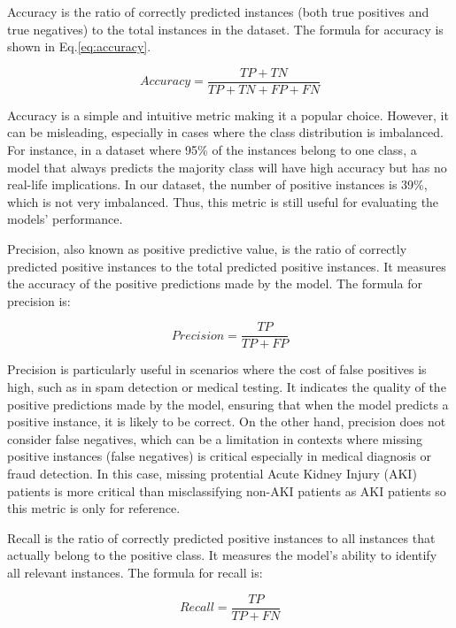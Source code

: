 \documentclass[../main.tex]{subfiles}
\begin{document}
Accuracy is the ratio of correctly predicted instances (both true positives and true negatives) to the total instances in the dataset.
The formula for accuracy is shown in Eq.\ref{eq:accuracy}.

\begin{equation}
    \label{eq:accuracy}
    Accuracy = \frac{TP + TN}{TP + TN + FP + FN}
\end{equation}

Accuracy is a simple and intuitive metric making it a popular choice.
However, it can be misleading, especially in cases where the class distribution is imbalanced.
For instance, in a dataset where 95\% of the instances belong to one class, a model that always predicts the majority class will have high accuracy but has no real-life implications.
In our dataset, the number of positive instances is 39\%, which is not very imbalanced.
Thus, this metric is still useful for evaluating the models' performance.

Precision, also known as positive predictive value, is the ratio of correctly predicted positive instances to the total predicted positive instances. It measures the accuracy of the positive predictions made by the model. The formula for precision is:

\begin{equation}
    \label{eq:precision}
    Precision = \frac{TP}{TP + FP}
\end{equation}

Precision is particularly useful in scenarios where the cost of false positives is high, such as in spam detection or medical testing.
It indicates the quality of the positive predictions made by the model, ensuring that when the model predicts a positive instance, it is likely to be correct.
On the other hand, precision does not consider false negatives, which can be a limitation in contexts where missing positive instances (false negatives) is critical especially in medical diagnosis or fraud detection.
In this case, missing protential Acute Kidney Injury (AKI) patients is more critical than misclassifying non-AKI patients as AKI patients so this metric is only for reference.


Recall is the ratio of correctly predicted positive instances to all instances that actually belong to the positive class.
It measures the model's ability to identify all relevant instances.
The formula for recall is:

\begin{equation}
    \label{eq:recall}
    Recall = \frac{TP}{TP + FN}
\end{equation}
\end{document}

